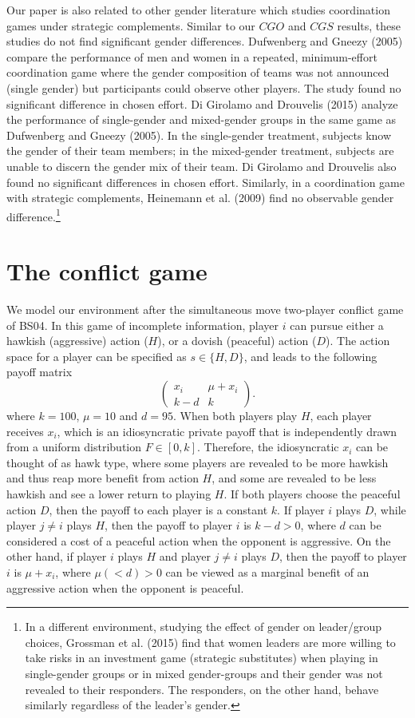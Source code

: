 \documentclass[11pt,english]{article}
\begin{document}
Our paper is also related to other gender literature which studies coordination games under strategic complements. Similar to our $CGO$ and $CGS$ results, these studies do not find significant gender differences.  Dufwenberg and Gneezy (2005) compare the performance of men and women in a repeated, minimum-effort coordination game where the gender composition of teams was not announced (single gender) but participants could observe other players. The study found no significant difference in chosen effort. Di Girolamo and Drouvelis (2015) analyze the performance of single-gender and mixed-gender groups in the same game as Dufwenberg and Gneezy (2005). In the single-gender treatment, subjects know the gender of their team members; in the mixed-gender treatment, subjects are unable to discern the gender mix of their team. Di Girolamo and Drouvelis also found no significant differences in chosen effort. Similarly, in a coordination game with strategic complements, Heinemann et al. (2009) find no observable gender difference.\footnote{In a different environment, studying the effect of gender on leader/group choices, Grossman et al. (2015) find that women leaders are more willing to take risks in an investment game (strategic substitutes) when playing in single-gender groups or in mixed gender-groups and their gender was not revealed to their responders. The responders, on the other hand, behave similarly regardless of the leader's gender.}

\section{The conflict game}
\label{sec:model}
We model our environment after the simultaneous move two-player conflict game of BS04. In this game of incomplete information, player $i$ can pursue either a hawkish (aggressive) action ($H$), or a dovish (peaceful) action ($D$). The action space for a player can be specified as $s\in\{H,D\}$, and leads to the following payoff matrix
\begin{equation}
\begin{pmatrix}
x_i & \mu+x_i \\
k-d & k 
\label{t:payoff}
\end{pmatrix}.
\end{equation}
where $k=100$, $\mu=10$ and $d=95$. When both players play $H$, each player receives $x_i$, which is an idiosyncratic private payoff that is independently drawn from a uniform distribution $F\in [0,k]$. Therefore, the idiosyncratic $x_i$ can be thought of as hawk type, where some players are revealed to be more hawkish and thus reap more benefit from action $H$, and some are revealed to be less hawkish and see a lower return to playing $H$. If both players choose the peaceful action $D$, then the payoff to each player is a constant $k$. If player $i$ plays $D$, while player $j\neq i$ plays $H$, then the payoff to player $i$ is $k-d>0$, where $d$ can be considered a cost of a peaceful action when the opponent is aggressive. On the other hand, if player $i$ plays $H$ and player $j\neq i$ plays $D$, then the payoff to player $i$ is $\mu+x_i$, where $\mu (<d)>0$ can be viewed as a marginal benefit of an aggressive action when the opponent is peaceful. 
\end{document}
